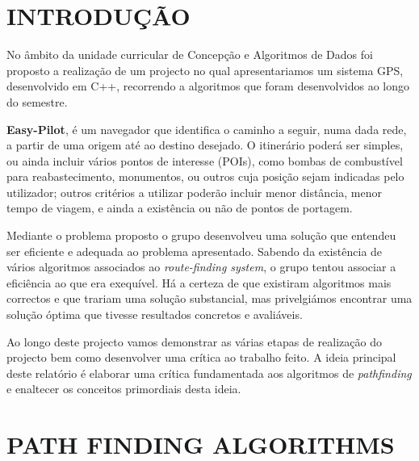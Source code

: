 \documentclass[a4paper]{article}
\begin{document}
\newpage

\tableofcontents

\newpage

\setcounter{secnumdepth}{0}
\section{INTRODUÇÃO}

\begin{small}



No âmbito da unidade curricular de Concepção e Algoritmos de Dados foi proposto a realização de um projecto no qual apresentariamos um sistema GPS, desenvolvido em C++, recorrendo a algoritmos que foram desenvolvidos ao longo do semestre. 

\textbf{Easy-Pilot}, é  um navegador que identifica o caminho a seguir, numa dada rede, a partir de uma origem até ao destino desejado. O itinerário poderá ser simples, ou ainda incluir vários pontos de interesse (POIs), como bombas de combustível para reabastecimento, monumentos, ou outros cuja posição sejam indicadas pelo utilizador; outros critérios a utilizar poderão incluir menor distância, menor tempo de viagem, e ainda a existência ou não de pontos de portagem. 

Mediante o problema proposto o grupo desenvolveu uma solução que entendeu ser eficiente e adequada ao problema apresentado. Sabendo da existência de vários algoritmos associados ao \textit{route-finding system}, o grupo tentou associar a eficiência ao que era exequível. Há a certeza de que existiram algoritmos mais correctos e que trariam uma solução substancial, mas privelgiámos encontrar uma solução óptima que tivesse resultados concretos e avaliáveis. 

Ao longo deste projecto vamos demonstrar as várias etapas de realização do projecto bem como desenvolver uma crítica ao trabalho feito. A ideia principal deste relatório é elaborar uma crítica fundamentada aos algoritmos de \textit{pathfinding} e enaltecer os conceitos primordiais desta ideia. 

\end{small}



\section{PATH FINDING ALGORITHMS}
\end{document}
